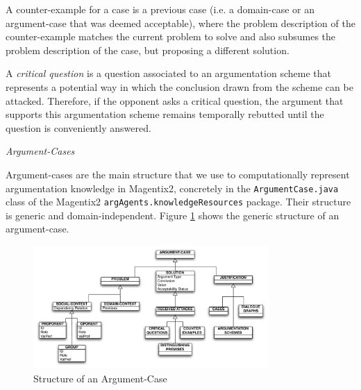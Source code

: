 \begin{definition}
 A counter-example for a case is a previous case (i.e. a domain-case or an argument-case that was deemed acceptable), where the problem description of the counter-example matches the current problem to solve and also subsumes the problem description of the case, but proposing a different solution. %
\end{definition}

\begin{definition}
 A \emph{critical question} is a question associated to an argumentation scheme that represents a potential way in which the conclusion drawn from the scheme can be attacked. Therefore, if the opponent asks a critical question, the argument that supports this argumentation scheme remains temporally rebutted until the question is conveniently answered. %
\end{definition}

\textit{Argument-Cases}

Argument-cases are the main structure that we use to computationally represent argumentation knowledge in Magentix2, concretely in the \lstinline{ArgumentCase.java} class of the Magentix2 \lstinline{argAgents.knowledgeResources} package. Their structure is generic and domain-independent. Figure \ref{fig:argCase} shows the generic structure of an argument-case.

\begin{figure}[t]
  \begin{center}
    \includegraphics[width=0.8\textwidth]{ProgrammingAgents/images/argumentCase.pdf}
 \end{center}
  \caption{Structure of an Argument-Case}
\label{fig:argCase}
\end{figure}

